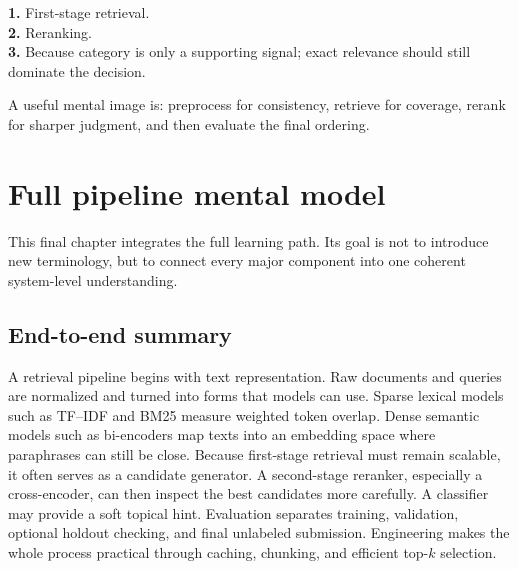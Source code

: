 \documentclass[11pt,oneside]{report}
\begin{document}
\begin{answerbox}
\textbf{1.} First-stage retrieval.\\
\textbf{2.} Reranking.\\
\textbf{3.} Because category is only a supporting signal; exact relevance should still dominate the decision.
\end{answerbox}

\begin{rememberbox}
A useful mental image is: preprocess for consistency, retrieve for coverage, rerank for sharper judgment, and then evaluate the final ordering.
\end{rememberbox}


\chapter[Full Pipeline Mental Model]{Full pipeline mental model}

\begin{purposebox}
This final chapter integrates the full learning path. Its goal is not to introduce new terminology, but to connect every major component into one coherent system-level understanding.
\end{purposebox}

\section*{End-to-end summary}
A retrieval pipeline begins with text representation. Raw documents and queries are normalized and turned into forms that models can use. Sparse lexical models such as TF--IDF and BM25 measure weighted token overlap. Dense semantic models such as bi-encoders map texts into an embedding space where paraphrases can still be close. Because first-stage retrieval must remain scalable, it often serves as a candidate generator. A second-stage reranker, especially a cross-encoder, can then inspect the best candidates more carefully. A classifier may provide a soft topical hint. Evaluation separates training, validation, optional holdout checking, and final unlabeled submission. Engineering makes the whole process practical through caching, chunking, and efficient top-$k$ selection.
\end{document}
